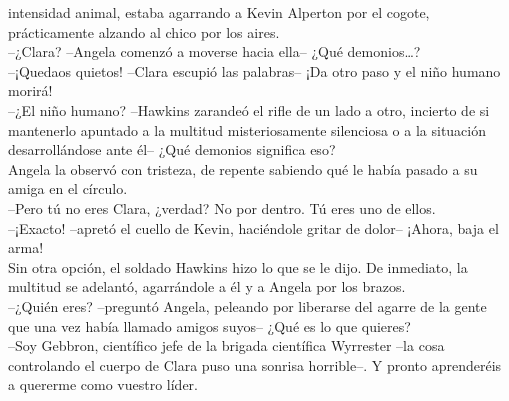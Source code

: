 intensidad animal, estaba agarrando a Kevin Alperton por el cogote,
prácticamente alzando al chico por los aires.\\
--¿Clara? --Angela comenzó a moverse hacia ella-- ¿Qué
demonios\ldots{}?\\
--¡Quedaos quietos! --Clara escupió las palabras-- ¡Da otro paso y el
niño humano morirá!\\
--¿El niño humano? --Hawkins zarandeó el rifle de un lado a otro,
incierto de si mantenerlo apuntado a la multitud misteriosamente
silenciosa o a la situación desarrollándose ante él-- ¿Qué demonios
significa eso?\\
Angela la observó con tristeza, de repente sabiendo qué le había pasado
a su amiga en el círculo.\\
--Pero tú no eres Clara, ¿verdad? No por dentro. Tú eres uno de ellos.\\
--¡Exacto! --apretó el cuello de Kevin, haciéndole gritar de dolor--
¡Ahora, baja el arma!\\
Sin otra opción, el soldado Hawkins hizo lo que se le dijo. De
inmediato, la multitud se adelantó, agarrándole a él y a Angela por los
brazos.\\
--¿Quién eres? --preguntó Angela, peleando por liberarse del agarre de
la gente que una vez había llamado amigos suyos-- ¿Qué es lo que
quieres?\\
--Soy Gebbron, científico jefe de la brigada científica Wyrrester --la
cosa controlando el cuerpo de Clara puso una sonrisa horrible--. Y
pronto aprenderéis a quererme como vuestro líder.\\[2\baselineskip]
